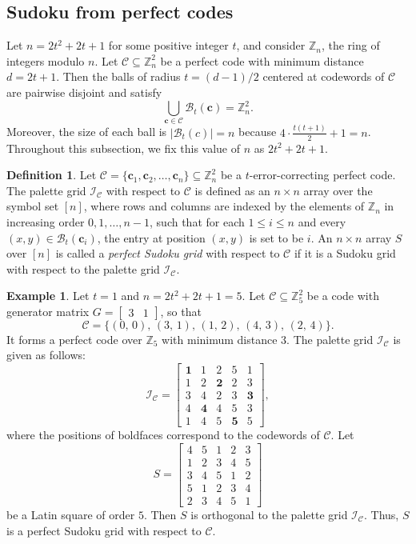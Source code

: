 \documentclass{article}
\theoremstyle{definition}
\newtheorem{definition}{Definition}[section]
\newtheorem{example}{Example}[section]
\begin{document}
\subsection{Sudoku from perfect codes}
Let $n=2t^2+2t+1$ for some positive integer $t$, and consider $\mathbb{Z}_n$, the ring of integers modulo $n$. Let $\mathcal{C}\subseteq\mathbb{Z}_n^2$ be a perfect code with minimum distance $d=2t+1$. Then the balls of radius $t=(d-1)/2$ centered at codewords of $\mathcal{C}$ are pairwise disjoint and satisfy
\[
\bigcup_{\mathbf{c}\in \mathcal{C}}\mathcal{B}_t(\mathbf{c})=\mathbb{Z}_n^2.
\]
Moreover, the size of each ball is $|\mathcal{B}_t(c)|=n$ because $4\cdot \frac{t(t+1)}{2}+1=n$. Throughout this subsection, we fix this value of $n$ as $2t^2 + 2t + 1$.

\begin{definition}
Let $\mathcal{C} = \{\mathbf{c}_1, \mathbf{c}_2, \dots, \mathbf{c}_n\} \subseteq \mathbb{Z}_n^2$ be a $t$-error-correcting perfect code. The palette grid $\mathcal{I}_\mathcal{C}$ with respect to $\mathcal{C}$ is defined as an $n \times n$ array over the symbol set $[n]$, where rows and columns are indexed by the elements of $\mathbb{Z}_n$ in increasing order $0, 1, \dots, n-1$, such that for each $1 \le i \le n$ and every $(x, y) \in \mathcal{B}_t(\mathbf{c}_i)$, the entry at position $(x, y)$ is set to be $i$. An $n\times n$ array $S$ over $[n]$ is called a \textit{perfect Sudoku grid} with respect to $\mathcal{C}$ if it is a Sudoku grid with respect to the palette grid $\mathcal{I}_\mathcal{C}$.
\end{definition}

\begin{example}\label{dpcodeex}
Let $t=1$ and $n=2t^2+2t+1=5$. Let $\mathcal{C}\subseteq\mathbb{Z}_5^2$ be a code with generator matrix $G=\begin{bmatrix}3 & 1\end{bmatrix}$, so that
\[
\mathcal{C}=\{(0,\, 0),\,(3,\,1),\,(1,\,2),\,(4,\,3),\,(2,\,4)\}.
\]
It forms a perfect code over $\mathbb{Z}_5$ with minimum distance $3$. The palette grid $\mathcal{I}_\mathcal{C}$ is given as follows:
\[
\mathcal{I}_\mathcal{C}=\begin{bmatrix}
    \mathbf{1} & 1 & 2 & 5 & 1\\1 & 2 & \mathbf{2} & 2 & 3\\3 & 4 & 2 & 3 & \mathbf{3}\\4 & \mathbf{4} & 4 & 5 & 3\\1 & 4 & 5 & \mathbf{5} & 5
\end{bmatrix},
\]
where the positions of boldfaces correspond to the codewords of $\mathcal{C}$. Let
\[
S=\begin{bmatrix}
    4 & 5 & 1 & 2 & 3\\1 & 2 & 3 & 4 & 5\\3 & 4 & 5 & 1 & 2\\5 & 1 & 2 & 3 & 4\\2 & 3 & 4 & 5 & 1
\end{bmatrix}
\]
be a Latin square of order $5$. Then $S$ is orthogonal to the palette grid $\mathcal{I}_\mathcal{C}$. Thus, $S$ is a perfect Sudoku grid with respect to $\mathcal{C}$.
\end{example}
\end{document}
